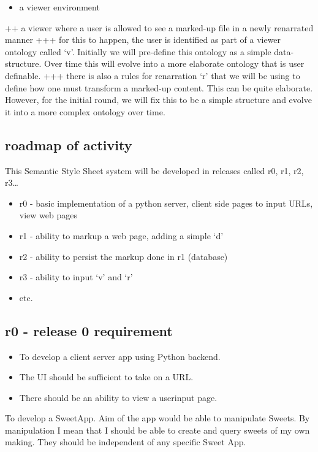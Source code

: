\documentclass[11pt]{article}
\begin{document}
\begin{itemize}
\item a viewer environment
\end{itemize}
++ a viewer where a user is allowed to see a marked-up file in a newly
renarrated manner
+++ for this to happen, the user is identified as part of a viewer
ontology called `v'. Initially we will pre-define this ontology as a
simple data-structure. Over time this will evolve into a more
elaborate ontology that is user definable.
+++ there is also a rules for renarration `r' that we will be using to
define how one must transform a marked-up content. This can be quite
elaborate. However, for the initial round, we will fix this to be a
simple structure and evolve it into a more complex ontology over time.
\subsection{roadmap of activity}
\label{sec-2-2}

This Semantic Style Sheet system will be developed in releases called
r0, r1, r2, r3\ldots{} 

\begin{itemize}
\item r0 - basic implementation of a python server, client side pages to
  input URLs, view web pages
\item r1 - ability to markup a web page, adding a simple `d'
\item r2 - ability to persist the markup done in r1 (database)
\item r3 - ability to input `v' and `r'
\item etc.
\end{itemize}
\subsection{r0 - release 0 requirement}
\label{sec-2-3}

\begin{itemize}
\item To develop a client server app using Python backend.
\item The UI should be sufficient to take on a URL.
\item There should be an ability to view a userinput page.
\end{itemize}


To develop a SweetApp. Aim of the app would be able to manipulate
Sweets. By manipulation I mean that I should be able to create and
query sweets of my own making. They should be independent of any
specific Sweet App. 
\end{document}
